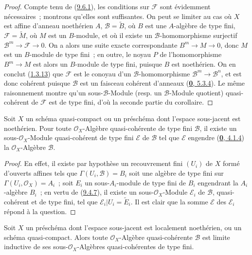 \begin{proof}
Compte tenu de (\hyperref[I.9.6.1-fr]{9.6.1}), les conditions sur
$\mathscr{F}$ sont évidemment nécessaires~; montrons qu'elles sont
suffisantes. On peut se limiter au cas où $X$ est affine d'anneau
noethérien $A$, $\mathscr{B}=\widetilde{B}$, où $B$ est une $A$-algèbre de
type fini, $\mathscr{F}=\widetilde{M}$, où $M$ est un $B$-module, et où il
existe un $\mathscr{B}$-homomorphisme surjectif
$\mathscr{B}^m\to\mathscr{F}\to 0$. On a alors une suite exacte
correspondante $B^m\to M\to 0$, donc $M$ est un $B$-module de type fini~;
en outre, le noyau $P$ de l'homomorphisme $B^m\to M$ est alors un
$B$-module de type fini, puisque $B$ est noethérien. On en conclut
(\hyperref[I.1.3.13-fr]{1.3.13}) que $\mathscr{F}$ est le conoyau d'un
$\mathscr{B}$-homomorphisme $\mathscr{B}^m\to\mathscr{B}^n$, et est donc
cohérent puisque $\mathscr{B}$ est un faisceau cohérent d'anneaux
(\hyperref[0.5.3.4-fr]{\textbf{0}, 5.3.4}). Le même raisonnement montre qu'un
sous-$\mathscr{B}$-Module (resp. un $\mathscr{B}$-Module quotient)
quasi-cohérent de $\mathscr{F}$ est de type fini, d'où la seconde partie du
corollaire.
\end{proof}

\begin{proposition}[9.6.5]
\label{I.9.6.5-fr}
Soit $X$ un schéma quasi-compact ou un préschéma dont l'espace sous-jacent
est noethérien. Pour toute $\mathscr{O}_X$-Algèbre quasi-cohérente de type
fini $\mathscr{B}$, il existe un sous-$\mathscr{O}_X$-Module quasi-cohérent
de type fini $\mathscr{E}$ de $\mathscr{B}$ tel que $\mathscr{E}$ engendre
\textup{(\hyperref[0.4.1.4-fr]{\textbf{0}, 4.1.4})} la $\mathscr{O}_X$-Algèbre
$\mathscr{B}$.
\end{proposition}

\begin{proof}
En effet, il existe par hypothèse un recouvrement fini $(U_i)$ de $X$ formé
d'ouverts affines tels que $\Gamma(U_i,\mathscr{B})=B_i$ soit une algèbre
de type fini sur $\Gamma(U_i,\mathscr{O}_X)=A_i$~; soit $E_i$ un
sous-$A_i$-module de type fini de $B_i$ engendrant la $A_i$-algèbre $B_i$~;
en vertu de (\hyperref[I.9.4.7-fr]{9.4.7}), il existe un
sous-$\mathscr{O}_X$-Module $\mathscr{E}_i$ de $\mathscr{B}$,
quasi-cohérent et de type fini, tel que
$\mathscr{E}_i|U_i=\widetilde{E}_i$. Il est clair que la somme
$\mathscr{E}$ des $\mathscr{E}_i$ répond à la question.
\end{proof}

\begin{proposition}[9.6.6]
\label{I.9.6.6-fr}
Soit $X$ un préschéma dont l'espace sous-jacent est localement noethérien,
ou un schéma quasi-compact. Alors toute $\mathscr{O}_X$-Algèbre
quasi-cohérente $\mathscr{B}$ est limite inductive de ses
sous-$\mathscr{O}_X$-Algèbres quasi-cohérentes de type fini.
\end{proposition}


